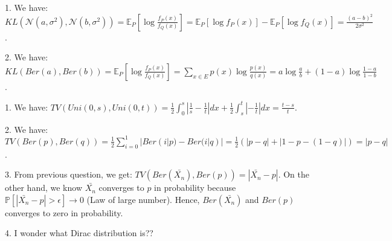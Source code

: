 \documentclass[10pt]{article}
\newenvironment{problem}[2][Problem]{\begin{trivlist}
\item[\hskip \labelsep {\bfseries #1}\hskip \labelsep {\bfseries #2.}]}{\end{trivlist}}
\begin{document}
\begin{problem}{3}
\item 1.
We have: $KL(\mathcal{N}(a, \sigma^2), \mathcal{N}(b, \sigma^2))=\mathbb{E}_P\left[\log{\frac{f_P(x)}{f_Q(x)}}\right]=\mathbb{E}_P\left[\log{f_P(x)}\right] - \mathbb{E}_P\left[\log{f_Q(x)}\right] = \frac{(a-b)^2}{2\sigma^2}$.\\
\item 2.
We have: $KL(Ber(a), Ber(b))=\mathbb{E}_P\left[\log{\frac{f_P(x)}{f_Q(x)}}\right]=\sum_{x \in E}p(x)\log{\frac{p(x)}{q(x)}} = a\log{\frac{a}{b}} + (1-a)\log{\frac{1-a}{1-b}}$.\\
\end{problem}


\begin{problem}{4}
\item 1.
We have: $TV(Uni(0,s), Uni(0,t))=\frac{1}{2}\int_{0}^{s}|\frac{1}{s}-\frac{1}{t}|dx + \frac{1}{2}\int_{s}^{t}|-\frac{1}{t}|dx=\frac{t-s}{t}$.\\
\item 2.
We have: $TV(Ber(p), Ber(q))=\frac{1}{2}\sum_{i=0}^{1}|Ber(i|p)-Ber(i|q)|=\frac{1}{2}(|p-q|+|1-p-(1-q)|)=|p-q|$.\\
\item 3.
From previous question, we get: $TV(Ber(\bar{X_n}), Ber(p))=|\bar{X_n}-p|$. On the other hand, we know $\bar{X_n}$ converges to $p$ in probability because $\mathbb{P}[|\bar{X_n}-p|>\epsilon] \longrightarrow 0$ (Law of large number). Hence, $Ber(\bar{X_n})$ and $Ber(p)$ converges to zero in probability.
\item 4. I wonder what Dirac distribution is??
\end{problem}
\end{document}
